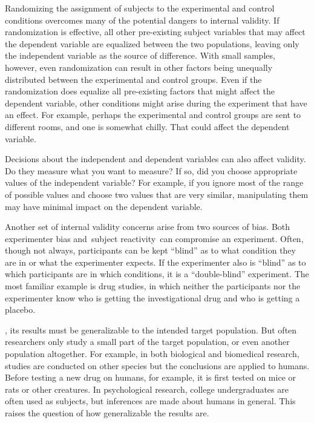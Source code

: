 \begin{refsection}
Randomizing the assignment of subjects to the experimental and control conditions overcomes many of the potential dangers to internal validity. If randomization is effective, all other pre-existing subject variables that may affect the dependent variable are equalized between the two populations, leaving only the independent variable as the source of difference. With small samples, however, even randomization can result in other factors being unequally distributed between the experimental and control groups. Even if the randomization does equalize all pre-existing factors that might affect the dependent variable, other conditions might arise during the experiment that have an effect. For example, perhaps the experimental and control groups are sent to different rooms, and one is somewhat chilly. That could affect the dependent variable.

Decisions about the independent and dependent variables can also affect validity. Do they measure what you want to measure? If so, did you choose appropriate values of the independent variable? For example, if you ignore most of the range of possible values and choose two values that are very similar, manipulating them may have minimal impact on the dependent variable.

Another set of internal validity concerns arise from two sources of bias. Both experimenter bias and subject reactivity can compromise an experiment. Often, though not always, participants can be kept ``blind'' as to what condition they are in or what the experimenter expects. If the experimenter also is ``blind'' as to which participants are in which conditions, it is a ``double-blind'' experiment. The most familiar example is drug studies, in which neither the participants nor the experimenter know who is getting the investigational drug and who is getting a placebo.

, its results must be generalizable to the intended target population. But often researchers only study a small part of the target population, or even another population altogether. For example, in both biological and biomedical research, studies are conducted on other species but the conclusions are applied to humans. Before testing a new drug on humans, for example, it is first tested on mice or rats or other creatures. In psychological research, college undergraduates are often used as subjects, but inferences are made about humans in general. This raises the question of how generalizable the results are.


\end{refsection}
